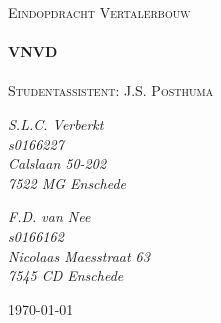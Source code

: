 \begin{titlepage}
 
\begin{center}
 
 

\textsc{\Large Eindopdracht Vertalerbouw}\\[0.5cm]
 
 
\HRule \\[0.4cm]
{ \huge \bfseries VNVD}\\[0.4cm]
 
\HRule \\[1.5cm]

\textsc{Studentassistent: J.S. Posthuma}\\[0.5cm]

\begin{minipage}{0.4\textwidth}
\begin{flushleft} \large
\emph{S.L.C. Verberkt \\
s0166227 \\
Calslaan 50-202 \\
7522 MG Enschede}
\end{flushleft}
\end{minipage}
\begin{minipage}{0.4\textwidth}
\begin{flushright} \large
\emph{F.D. van Nee \\
s0166162 \\
Nicolaas Maesstraat 63 \\
7545 CD Enschede }
\end{flushright}
\end{minipage}

\vfill

{\large \today}
 
\end{center}
 
\end{titlepage}
